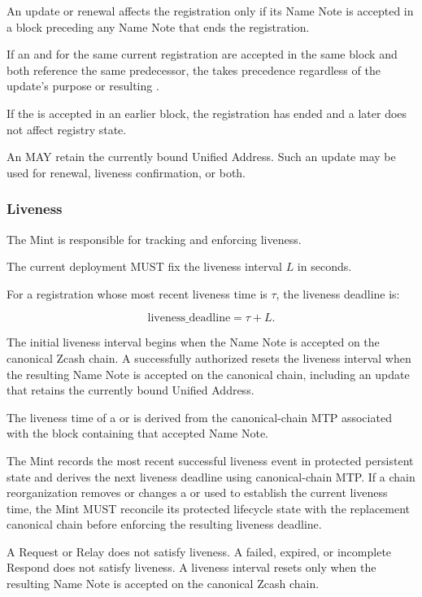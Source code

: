 An update or renewal affects the registration only if its Name Note is accepted in a block preceding any  Name Note that ends the registration.

If an  and  for the same current registration are accepted in the same block and both reference the same predecessor, the  takes precedence regardless of the update's purpose or resulting .

If the  is accepted in an earlier block, the registration has ended and a later  does not affect registry state.

An  MAY retain the currently bound Unified Address. Such an update may be used for renewal, liveness confirmation, or both.

\subsubsection{Liveness}

The Mint is responsible for tracking and enforcing liveness.

The current \zns{} deployment MUST fix the liveness interval $L$ in seconds.

For a registration whose most recent liveness time is $\tau$, the liveness deadline is:

$$\text{liveness\_deadline} = \tau + L.$$

The initial liveness interval begins when the  Name Note is accepted on the canonical Zcash chain. A successfully authorized  resets the liveness interval when the resulting Name Note is accepted on the canonical chain, including an update that retains the currently bound Unified Address.

The liveness time of a  or  is derived from the canonical-chain MTP associated with the block containing that accepted Name Note.

The Mint records the most recent successful liveness event in protected persistent state and derives the next liveness deadline using canonical-chain MTP. If a chain reorganization removes or changes a  or  used to establish the current liveness time, the Mint MUST reconcile its protected lifecycle state with the replacement canonical chain before enforcing the resulting liveness deadline.

A Request or Relay does not satisfy liveness. A failed, expired, or incomplete Respond does not satisfy liveness. A liveness interval resets only when the resulting  Name Note is accepted on the canonical Zcash chain.


